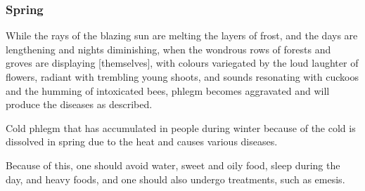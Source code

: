 \begin{translation}
\subsubsection{Spring}%

\item[39--41] %
While the rays of the blazing sun %
are melting %
the layers of frost, %
and the days are lengthening and nights diminishing, %
%
when the wondrous  %
rows of forests and groves %
are displaying [themselves], %
with colours variegated %
by the loud laughter of flowers, %
radiant with trembling young shoots, %
and sounds %
resonating with cuckoos %
and the humming of intoxicated bees, %
%
phlegm becomes aggravated %
and will produce %
the diseases as described. %

\item[42] %
Cold phlegm that has accumulated in people during winter because of the cold is dissolved %
in spring due to the heat and causes various diseases.

\item[43] 
Because of this, one should avoid water, sweet and oily food, sleep during the day, and heavy foods, and one should also undergo treatments, such as emesis.

\item[44--45] 


\end{translation}
